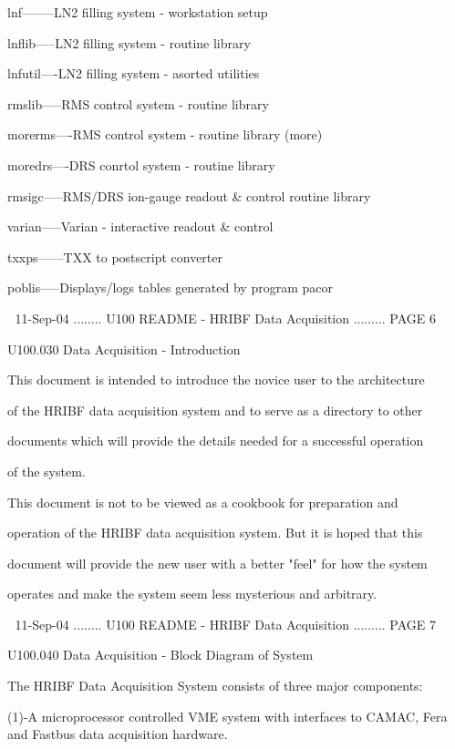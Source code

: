    lnf--------LN2 filling system - workstation setup
 
   lnflib-----LN2 filling system - routine library
 
   lnfutil----LN2 filling system - asorted utilities
 
   rmslib-----RMS control system - routine library
 
   morerms----RMS control system - routine library (more)
 
   moredrs----DRS conrtol system - routine library
 
   rmsigc-----RMS/DRS ion-gauge readout & control routine library
 
   varian-----Varian - interactive readout & control
 
   txxps------TXX to postscript converter
 
   poblis-----Displays/logs tables generated by program pacor
 
    
   11-Sep-04 ........ U100  README - HRIBF Data Acquisition ......... PAGE   6
 
 
   U100.030  Data Acquisition - Introduction
 
 
   This document is intended to introduce the novice user to the  architecture
 
   of  the  HRIBF data acquisition system and to serve as a directory to other
 
   documents which will provide the details needed for a successful  operation
 
   of the system.
 
 
   This  document  is  not  to  be  viewed  as  a cookbook for preparation and
 
   operation of the HRIBF data acquisition system. But it is hoped  that  this
 
   document  will provide the new user with a better "feel" for how the system
 
   operates and make the system seem less mysterious and arbitrary.
 
    
   11-Sep-04 ........ U100  README - HRIBF Data Acquisition ......... PAGE   7
 
 
 
   U100.040  Data Acquisition - Block Diagram of System
 
 
 
   The HRIBF Data Acquisition System consists of three major components:
 
   (1)-A microprocessor controlled VME system with interfaces to  CAMAC,  Fera
       and Fastbus data acquisition hardware.
 
